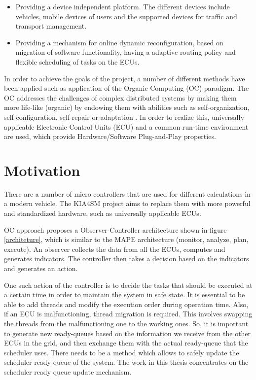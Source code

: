 \begin{itemize}
\item Providing a device independent platform. The different devices include vehicles, mobile devices of users and the supported devices for traffic and transport management.

\item Providing a mechanism for online dynamic reconfiguration, based on migration of software functionality, having a adaptive routing policy and flexible scheduling of tasks on the ECUs.
\end{itemize}

In order to achieve the goals of the project, a number of different methods have been applied such as application of the Organic Computing (OC) paradigm. The OC addresses the challenges of complex distributed systems by making them more life-like (organic) by endowing them with abilities such as self-organization, self-configuration, self-repair or adaptation \cite{branke2006organic}. In order to realize this, universally applicable Electronic Control Units (ECU) and a common run-time environment are used, which provide Hardware/Software Plug-and-Play properties.

\section{Motivation}

There are a number of micro controllers that are used for different calculations in a modern vehicle. The KIA4SM project aims to replace them with more powerful and standardized hardware, such as universally applicable ECUs. 

OC approach proposes a Observer-Controller architecture shown in figure \ref{architeture}, which is similar to the MAPE architecture (monitor, analyze, plan, execute). An observer collects the data from all the ECUs, computes and generates indicators. The controller then takes a decision based on the indicators and generates an action.

One such action of the controller is to decide the tasks that should be executed at a certain time in order to maintain the system in safe state. It is essential to be able to add threads and modify the execution order during operation time. Also, if an ECU is malfunctioning, thread migration is required. This involves swapping the threads from the malfunctioning one to the working ones. So, it is important to generate new ready-queues based on the information we receive from the other ECUs in the grid, and then exchange them with the actual ready-queue that the scheduler uses. There needs to be a method which allows to safely update the scheduler ready queue of the system. The work in this thesis concentrates on the scheduler ready queue update mechanism.


